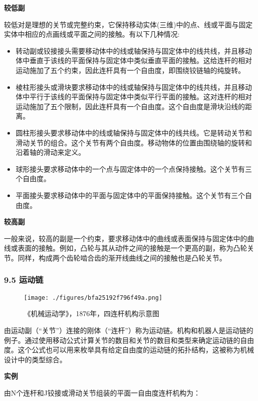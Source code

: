 \textbf{较低副}

较低对是理想的关节或完整约束，它保持移动实体(三维)中的点、线或平面与固定实体中相应的点画线或平面之间的接触。有以下几种情况:

\begin{itemize}
\item 转动副或铰接接头需要移动体中的线或轴保持与固定体中的线共线，并且移动体中垂直于该线的平面保持与固定体中类似垂直平面的接触。这给连杆的相对运动施加了五个约束，因此连杆具有一个自由度，即围绕铰链轴的纯旋转。
\item 棱柱形接头或滑块要求移动体中的线或轴保持与固定体中的线共线，并且移动体中平行于该线的平面保持与固定体中类似平行平面的接触。这对连杆的相对运动施加了五个限制，因此连杆具有一个自由度。这个自由度是滑块沿线的距离。
\item 圆柱形接头要求移动体中的线或轴保持与固定体中的线共线。它是转动关节和滑动关节的组合。这个关节有两个自由度。移动物体的位置由围绕轴的旋转和沿着轴的滑动来定义。
\item 球形接头要求移动体中的一个点与固定体中的一个点保持接触。这个关节有三个自由度。
\item 平面接头要求移动体中的平面与固定体中的平面保持接触。这个关节有三个自由度。
\end{itemize}


\textbf{较高副}

一般来说，较高的副是一个约束，要求移动体中的曲线或表面保持与固定体中的曲线或表面的接触。例如，凸轮与其从动件之间的接触是一个更高的副，称为凸轮关节。同样，构成两个齿轮啮合齿的渐开线曲线之间的接触也是凸轮关节。

\subsubsection{9.5 运动链}

\begin{figure}[ht]
\centering
\texttt{[image: ./figures/bfa25192f796f49a.png]}
\caption{《机械运动学》，1876年，四连杆机构示意图} \label{fig_YDX_1}
\end{figure}

由运动副（“关节”）连接的刚体（“连杆”）称为运动链。机构和机器人是运动链的例子。通过使用移动公式计算关节的数目和关节的数目和类型来确定运动链的自由度。这个公式也可以用来枚举具有给定自由度的运动链的拓扑结构，这被称为机械设计中的类型综合。

\textbf{实例}

由N个连杆和J铰接或滑动关节组装的平面一自由度连杆机构为：

